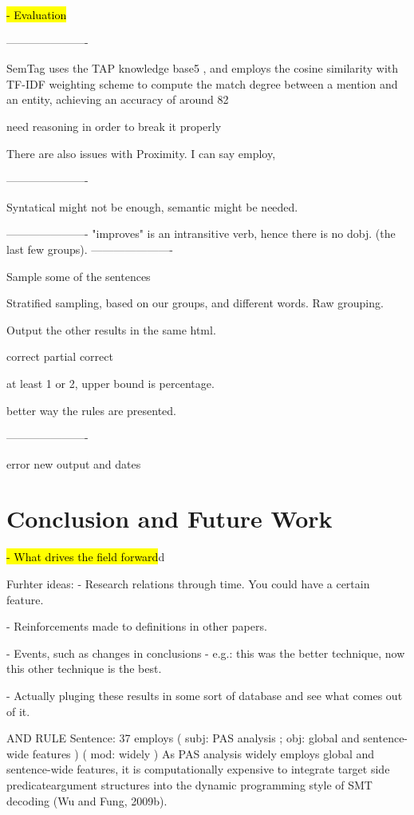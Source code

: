\documentclass[11pt,a4paper,openright]{memoir}
\begin{document}
\hl{- Evaluation}


----------------------

	SemTag uses the TAP knowledge base5 , and employs the cosine similarity with TF-IDF weighting scheme to compute the match degree between a mention and an entity, achieving an accuracy of around 82%
	
need reasoning in order to break it properly

There are also issues with Proximity. I can say employ, 

----------------------

Syntatical might not be enough, semantic might be needed.



----------------------
"improves" is an intransitive verb, hence there is no dobj. (the last few groups). 
----------------------

Sample some of the sentences

Stratified sampling, based on our groups, and different words. Raw grouping.

Output the other results in the same html.

correct
partial correct

at least 1 or 2, upper bound is percentage.

better way the rules are presented.

----------------------

error
new output
and
dates



%
%
%
%


\chapter{Conclusion and Future Work}

\hl{- What drives the field forward}d

Furhter ideas:
- Research relations through time. You could have a certain feature.

- Reinforcements made to definitions in other papers.

- Events, such as changes in conclusions - e.g.: this was the better technique, now this other technique is the best.

- Actually pluging these results in some sort of database and see what comes out of it.

AND RULE
Sentence: 37	employs	( subj: PAS analysis ; obj: global and sentence-wide features )
( mod: widely )
As PAS analysis widely employs global and sentence-wide features, it is computationally expensive to integrate target side predicateargument structures into the dynamic programming style of SMT decoding (Wu and Fung, 2009b).




\backmatter

\printbibliography

\appendix
\end{document}
